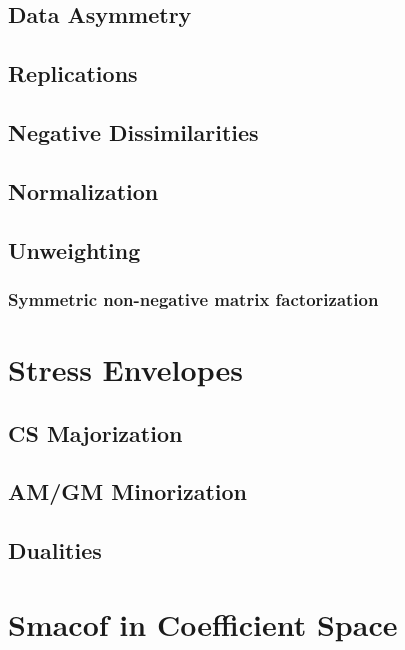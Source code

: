 \documentclass[
  12pt,
]{book}
\begin{document}
\subsection{Data Asymmetry}\label{datasym}

\subsection{Replications}\label{minrepl}

\subsection{Negative Dissimilarities}\label{negative-dissimilarities}

\subsection{Normalization}\label{normalization}

\subsection{Unweighting}\label{minunweight}

\subsubsection{Symmetric non-negative matrix factorization}\label{symnmf}

\section{Stress Envelopes}\label{propenvelopes}

\subsection{CS Majorization}\label{propcsmaj}

\subsection{AM/GM Minorization}\label{propamgmmin}

\subsection{Dualities}\label{dualities}

\section{Smacof in Coefficient Space}\label{smacofcoef}
\end{document}
